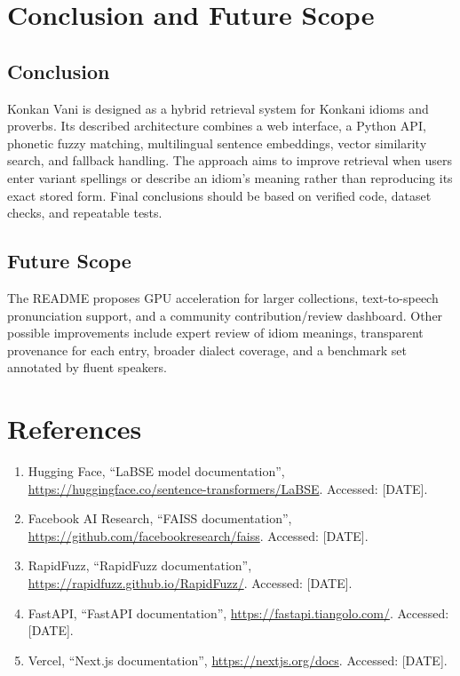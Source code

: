\documentclass[12pt,a4paper]{report}
\begin{document}
\chapter{Conclusion and Future Scope}

\section{Conclusion}
Konkan Vani is designed as a hybrid retrieval system for Konkani idioms and
proverbs. Its described architecture combines a web interface, a Python API,
phonetic fuzzy matching, multilingual sentence embeddings, vector similarity
search, and fallback handling. The approach aims to improve retrieval when users
enter variant spellings or describe an idiom's meaning rather than reproducing its
exact stored form. Final conclusions should be based on verified code, dataset
checks, and repeatable tests.

\section{Future Scope}
The README proposes GPU acceleration for larger collections, text-to-speech
pronunciation support, and a community contribution/review dashboard. Other
possible improvements include expert review of idiom meanings, transparent
provenance for each entry, broader dialect coverage, and a benchmark set annotated
by fluent speakers.

\chapter*{References}
\begin{enumerate}
    \item Hugging Face, ``LaBSE model documentation'',
          \url{https://huggingface.co/sentence-transformers/LaBSE}. Accessed:
          [DATE].
    \item Facebook AI Research, ``FAISS documentation'',
          \url{https://github.com/facebookresearch/faiss}. Accessed: [DATE].
    \item RapidFuzz, ``RapidFuzz documentation'',
          \url{https://rapidfuzz.github.io/RapidFuzz/}. Accessed: [DATE].
    \item FastAPI, ``FastAPI documentation'', \url{https://fastapi.tiangolo.com/}.
          Accessed: [DATE].
    \item Vercel, ``Next.js documentation'', \url{https://nextjs.org/docs}.
          Accessed: [DATE].
\end{enumerate}
\end{document}
